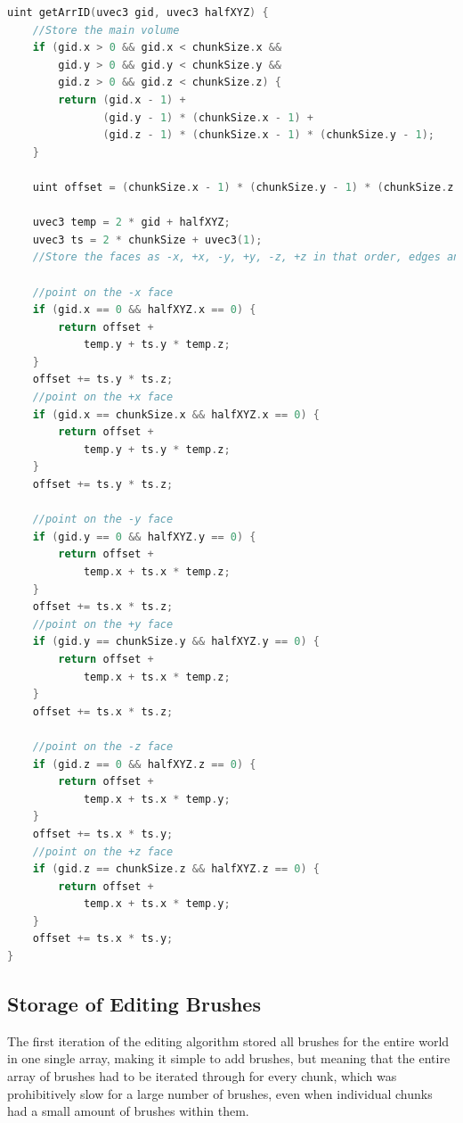\documentclass[11pt]{article}
\begin{document}
\begin{lstlisting}[language=C++,label={tv_arrID_2},caption={The more efficient \texttt{getArrID} function.}]
  uint getArrID(uvec3 gid, uvec3 halfXYZ) {
    //Store the main volume
    if (gid.x > 0 && gid.x < chunkSize.x &&
        gid.y > 0 && gid.y < chunkSize.y &&
        gid.z > 0 && gid.z < chunkSize.z) {
        return (gid.x - 1) +
               (gid.y - 1) * (chunkSize.x - 1) +
               (gid.z - 1) * (chunkSize.x - 1) * (chunkSize.y - 1); 
    }

    uint offset = (chunkSize.x - 1) * (chunkSize.y - 1) * (chunkSize.z - 1);

    uvec3 temp = 2 * gid + halfXYZ;
    uvec3 ts = 2 * chunkSize + uvec3(1);
    //Store the faces as -x, +x, -y, +y, -z, +z in that order, edges and corners are stored in the first place in this ordering (some unpopulated values)

    //point on the -x face
    if (gid.x == 0 && halfXYZ.x == 0) {
        return offset +
            temp.y + ts.y * temp.z;
    }
    offset += ts.y * ts.z;
    //point on the +x face
    if (gid.x == chunkSize.x && halfXYZ.x == 0) {
        return offset +
            temp.y + ts.y * temp.z;
    }
    offset += ts.y * ts.z;

    //point on the -y face
    if (gid.y == 0 && halfXYZ.y == 0) {
        return offset +
            temp.x + ts.x * temp.z;
    }
    offset += ts.x * ts.z;
    //point on the +y face
    if (gid.y == chunkSize.y && halfXYZ.y == 0) {
        return offset +
            temp.x + ts.x * temp.z;
    }
    offset += ts.x * ts.z;

    //point on the -z face
    if (gid.z == 0 && halfXYZ.z == 0) {
        return offset +
            temp.x + ts.x * temp.y;
    }
    offset += ts.x * ts.y;
    //point on the +z face
    if (gid.z == chunkSize.z && halfXYZ.z == 0) {
        return offset +
            temp.x + ts.x * temp.y;
    }
    offset += ts.x * ts.y;
}
\end{lstlisting}

\subsection{Storage of Editing Brushes}
The first iteration of the editing algorithm stored all brushes for the entire world in one single array, making it simple to add brushes, but meaning that the entire array of brushes had to be iterated through for every chunk, which was prohibitively slow for a large number of brushes, even when individual chunks had a small amount of brushes within them. 
\end{document}
